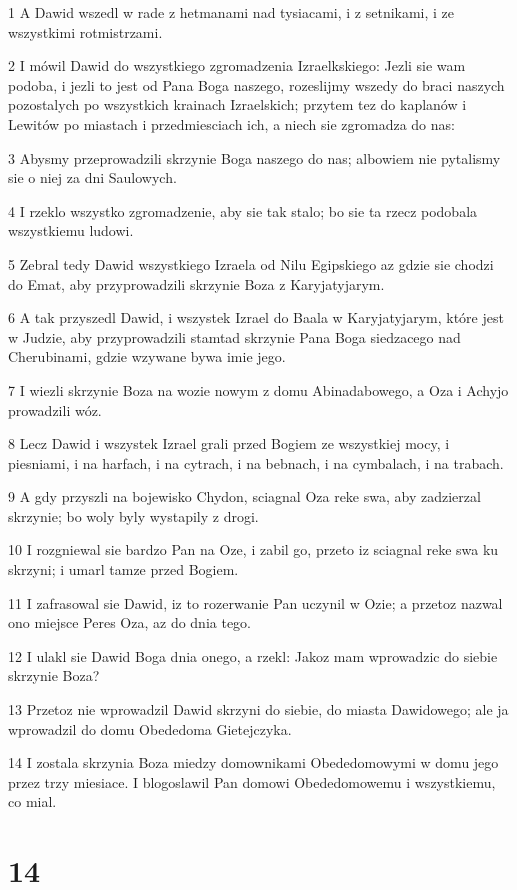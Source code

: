 \par 1 A Dawid wszedl w rade z hetmanami nad tysiacami, i z setnikami, i ze wszystkimi rotmistrzami.
\par 2 I mówil Dawid do wszystkiego zgromadzenia Izraelkskiego: Jezli sie wam podoba, i jezli to jest od Pana Boga naszego, rozeslijmy wszedy do braci naszych pozostalych po wszystkich krainach Izraelskich; przytem tez do kaplanów i Lewitów po miastach i przedmiesciach ich, a niech sie zgromadza do nas:
\par 3 Abysmy przeprowadzili skrzynie Boga naszego do nas; albowiem nie pytalismy sie o niej za dni Saulowych.
\par 4 I rzeklo wszystko zgromadzenie, aby sie tak stalo; bo sie ta rzecz podobala wszystkiemu ludowi.
\par 5 Zebral tedy Dawid wszystkiego Izraela od Nilu Egipskiego az gdzie sie chodzi do Emat, aby przyprowadzili skrzynie Boza z Karyjatyjarym.
\par 6 A tak przyszedl Dawid, i wszystek Izrael do Baala w Karyjatyjarym, które jest w Judzie, aby przyprowadzili stamtad skrzynie Pana Boga siedzacego nad Cherubinami, gdzie wzywane bywa imie jego.
\par 7 I wiezli skrzynie Boza na wozie nowym z domu Abinadabowego, a Oza i Achyjo prowadzili wóz.
\par 8 Lecz Dawid i wszystek Izrael grali przed Bogiem ze wszystkiej mocy, i piesniami, i na harfach, i na cytrach, i na bebnach, i na cymbalach, i na trabach.
\par 9 A gdy przyszli na bojewisko Chydon, sciagnal Oza reke swa, aby zadzierzal skrzynie; bo woly byly wystapily z drogi.
\par 10 I rozgniewal sie bardzo Pan na Oze, i zabil go, przeto iz sciagnal reke swa ku skrzyni; i umarl tamze przed Bogiem.
\par 11 I zafrasowal sie Dawid, iz to rozerwanie Pan uczynil w Ozie; a przetoz nazwal ono miejsce Peres Oza, az do dnia tego.
\par 12 I ulakl sie Dawid Boga dnia onego, a rzekl: Jakoz mam wprowadzic do siebie skrzynie Boza?
\par 13 Przetoz nie wprowadzil Dawid skrzyni do siebie, do miasta Dawidowego; ale ja wprowadzil do domu Obededoma Gietejczyka.
\par 14 I zostala skrzynia Boza miedzy domownikami Obededomowymi w domu jego przez trzy miesiace. I blogoslawil Pan domowi Obededomowemu i wszystkiemu, co mial.

\chapter{14}

